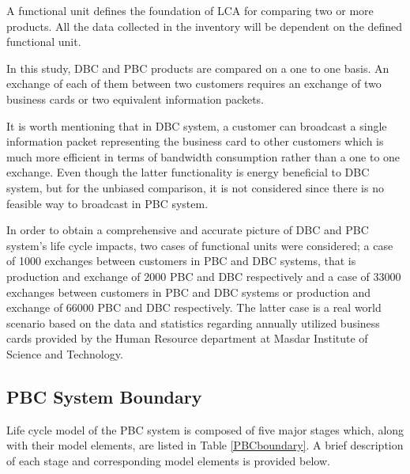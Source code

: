 \documentclass[conference]{IEEEtran}
\begin{document}
A functional unit defines the foundation of LCA for comparing two or more products. All the data collected in the inventory will be dependent on the defined functional unit.

In this study, DBC and PBC products are compared on a one to one basis. An exchange of each of them between two customers requires an exchange of two business cards or two equivalent information packets. 

It is worth mentioning that in DBC system, a customer can broadcast a single information packet representing the business card to other customers which is much more efficient in terms of bandwidth consumption rather than a one to one exchange. Even though the latter functionality is energy beneficial to DBC system, but for the unbiased comparison, it is not considered since there is no feasible way to broadcast in PBC system.

In order to obtain a comprehensive and accurate picture of DBC and PBC system's life cycle impacts, two cases of functional units were considered; a case of 1000 exchanges between customers in PBC and DBC systems, that is production and exchange of 2000 PBC and DBC respectively and a case of 33000 exchanges between customers in PBC and DBC systems or production and exchange of 66000 PBC and DBC respectively. The latter case is a real world scenario based on the data and statistics regarding annually utilized business cards provided by the Human Resource department at Masdar Institute of Science and Technology.  


\subsection{PBC System Boundary} \label{PBCBoundary}
Life cycle model of the PBC system is composed of five major stages which, along with their model elements, are listed in Table \ref{PBCboundary}. A brief description of each stage and corresponding model elements is provided below.
\end{document}
